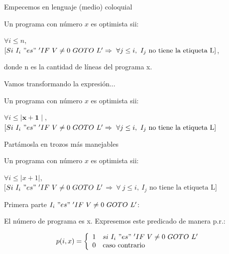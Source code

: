 \documentclass[10pt]{beamer}
\begin{document}
\begin{frame}{Empecemos en lenguaje (medio) coloquial}



Un programa con número $x$ es optimista sii:\bigskip

 $\forall i \leq n$,\\
  $[Si\ I_i\ "es"\ 'IF\ V \neq 0\ GOTO\ L' \Rightarrow\ \forall j \leq i,\ I_j\text{ no tiene la etiqueta L}]$,

 donde n es la cantidad de líneas del programa x.


\end{frame}


\begin{frame}{Vamos transformando la expresión...}

Un programa con número $x$ es optimista sii:\bigskip

 $\forall i \leq \bm{\mid x+1\mid}$,\\
 $[Si\ I_i\ "es"\ 'IF\ V \neq 0\ GOTO\ L' \Rightarrow\ \forall j \leq i,\ I_j\text{ no tiene la etiqueta L}]$
\end{frame}

\begin{frame}{Partámosla en trozos más manejables}

Un programa con número $x$ es optimista sii:\bigskip

 $\forall i \leq |x+1|$,\\
 $[$\color{red}$Si\ I_i\ "es"\ 'IF\ V \neq 0\ GOTO\ L'$\color{black}$ \Rightarrow\ $\color{blue}$\forall\ j \leq i,\ I_j\text{ no tiene la etiqueta L}]$\color{black}
 
 
\end{frame}


\begin{frame}{Primera parte}
	\color{red}$I_i\ "es"\ 'IF\ V \neq 0\ GOTO\ L'$\color{black}: \bigskip
	
	El número de programa es x. Expresemos este predicado de manera p.r.:
	
	$$p(i,x) = \left\{
    \begin{array}{c l}
     1    & si\ I_i\ "es"\ 'IF\ V \neq 0\ GOTO\ L' \\
	 0    & \text{caso contrario}
     
    \end{array}
    \right.
    $$
\end{frame}
\end{document}
